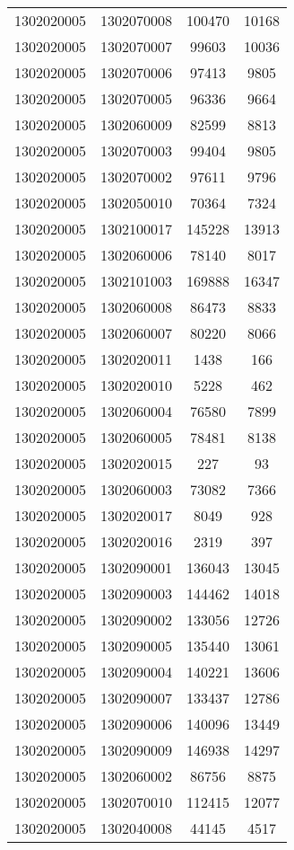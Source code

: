 \begin{longtable}{llcc}
1302020005 & 1302070008 & 100470 & 10168\\
1302020005 & 1302070007 & 99603 & 10036\\
1302020005 & 1302070006 & 97413 & 9805\\
1302020005 & 1302070005 & 96336 & 9664\\
1302020005 & 1302060009 & 82599 & 8813\\
1302020005 & 1302070003 & 99404 & 9805\\
1302020005 & 1302070002 & 97611 & 9796\\
1302020005 & 1302050010 & 70364 & 7324\\
1302020005 & 1302100017 & 145228 & 13913\\
1302020005 & 1302060006 & 78140 & 8017\\
1302020005 & 1302101003 & 169888 & 16347\\
1302020005 & 1302060008 & 86473 & 8833\\
1302020005 & 1302060007 & 80220 & 8066\\
1302020005 & 1302020011 & 1438 & 166\\
1302020005 & 1302020010 & 5228 & 462\\
1302020005 & 1302060004 & 76580 & 7899\\
1302020005 & 1302060005 & 78481 & 8138\\
1302020005 & 1302020015 & 227 & 93\\
1302020005 & 1302060003 & 73082 & 7366\\
1302020005 & 1302020017 & 8049 & 928\\
1302020005 & 1302020016 & 2319 & 397\\
1302020005 & 1302090001 & 136043 & 13045\\
1302020005 & 1302090003 & 144462 & 14018\\
1302020005 & 1302090002 & 133056 & 12726\\
1302020005 & 1302090005 & 135440 & 13061\\
1302020005 & 1302090004 & 140221 & 13606\\
1302020005 & 1302090007 & 133437 & 12786\\
1302020005 & 1302090006 & 140096 & 13449\\
1302020005 & 1302090009 & 146938 & 14297\\
1302020005 & 1302060002 & 86756 & 8875\\
1302020005 & 1302070010 & 112415 & 12077\\
1302020005 & 1302040008 & 44145 & 4517\\

\end{longtable}
